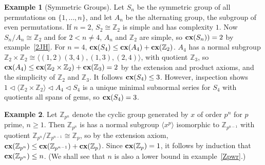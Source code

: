 \documentclass[a4paper,11pt]{amsart}
\theoremstyle{definition}
\newtheorem{example}{Example}
\newcommand{\cx}{\mbox{\bf cx}}
\newcommand{\Z}{\mathbb{Z}}
\newcommand{\1}{{\mathbf 1}}
\begin{document}
\begin{example}[Symmetric Groups]\label{SymExample} Let $S_n$ be the symmetric group of
all permutations on $\{1,\ldots, n\}$, and let $A_n$ be the alternating group, the subgroup  of even permutations. 
If $n=2$, $S_2\cong\Z_2$ is simple and has complexity $1$. 
Now $S_n/A_n \cong \Z_2$ and for $2< n\neq 4$, $A_n$ and $\Z_2$ are simple, so $\cx(S_n))=2$ by example~\ref{2JH}. 
For $n=4$, $\cx(S_4)\leq \cx(A_4)+\cx(\Z_2)$.  $A_4$ has a normal subgroup $\Z_2\times \Z_2 \cong \langle (1,2)(3,4), (1,3),(2,4)\rangle$,
with quotient $\Z_3$, so $\cx(A_4)\leq \cx(\Z_2\times \Z_2) +\cx(\Z_3)=2$ by the extension and product axioms, and the simplicity
of $\Z_2$ and $\Z_3$.  It follows $\cx(S_4)\leq 3$.   
However, inspection shows $1\lhd  \langle \Z_2\times \Z_2\rangle\lhd  A_4 \lhd S_4$ is a unique minimal subnormal series for $S_4$ with quotients all spans of gems, so $\cx(S_4)=3$.
\end{example}
\begin{example} \label{ZpnExample}
Let $\Z_{p^n}$ denote the cyclic group generated by $x$ of order $p^n$ for $p$ prime, $n\geq 1$.
Then $\Z_{p^n}$ is has a normal subgroup $\langle x^p \rangle$ isomorphic to $\Z_{p^{n-1}}$ with quotient $\Z_{p^n}/\Z_{p^{n-1}}\cong \Z_p$,
so by the extension axiom, $\cx(\Z_{p^n})\leq \cx(\Z_{p^{n-1}}) + \cx(\Z_p)$. Since $\cx(\Z_p)=1$, it follows by induction that
$\cx(\Z_{p^n})\leq n$.  (We shall see that $n$ is also a lower bound in example~\ref{Zpwr}.)
\end{example}


\end{document}
